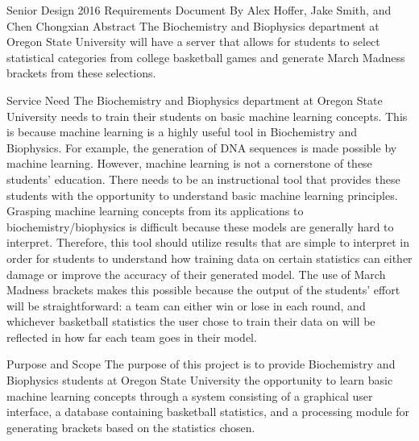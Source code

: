 \documentclass[letterpaper, 10pt,titlepage]{article}
\begin{document}
\begin{center}

Senior Design 2016
\bigbreak
Requirements Document
\bigbreak
By Alex Hoffer, Jake Smith, and Chen Chongxian
\bigbreak
\quad \quad \quad \quad \quad \quad Abstract
\newline
\newline
The Biochemistry and Biophysics department at Oregon State University will have a server that allows for students to select statistical categories from college basketball games and generate March Madness brackets from these selections.
\newpage
\end{center}





\begin{section}{Service Need}
The Biochemistry and Biophysics department at Oregon State University needs to train their students on basic machine learning concepts. This is because machine learning is a highly useful tool in Biochemistry and Biophysics. For example, the generation of DNA sequences is made possible by machine learning. However, machine learning is not a cornerstone of these students’ education. There needs to be an instructional tool that provides these students with the opportunity to understand basic machine learning principles. Grasping machine learning concepts from its applications to biochemistry/biophysics is difficult because these models are generally hard to interpret. Therefore, this tool should utilize results that are simple to interpret in order for students to understand how training data on certain statistics can either damage or improve the accuracy of their generated model. The use of March Madness brackets makes this possible because the output of the students’ effort will be straightforward: a team can either win or lose in each round, and whichever basketball statistics the user chose to train their data on will be reflected in how far each team goes in their model.
\end{section}


\begin{section}{Purpose and Scope}
The purpose of this project is to provide Biochemistry and Biophysics students at Oregon State University the opportunity to learn basic machine learning concepts through a system consisting of a graphical user interface, a database containing basketball statistics, and a processing module for generating brackets based on the statistics chosen.


\end{section}
\end{document}
